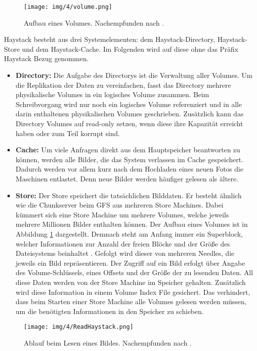 \documentclass[12pt,oneside,a4paper,parskip]{scrbook}
\begin{document}
\begin{figure}
  \centering
  \texttt{[image: img/4/volume.png]}
  \caption[Aufbau eines Volumes]{ Aufbau eines Volumes. Nachempfunden nach \cite{haystack}.}
  \label{volume}
\end{figure}
Haystack besteht aus drei Systemelementen: dem Haystack-Directory, Haystack-Store und dem Haystack-Cache. Im Folgenden wird auf diese ohne das Präfix Haystack Bezug genommen.
\begin{itemize}
  \item \textbf{Directory:} Die Aufgabe des Directorys ist die Verwaltung aller Volumes. Um die Replikation der Daten zu vereinfachen, fasst das Directory mehrere physikalische Volumes in ein logisches Volume zusammen. Beim Schreibvorgang wird nur noch ein logisches Volume referenziert und in alle darin enthaltenen physikalischen Volumes geschrieben. Zusätzlich kann das Directory Volumes auf read-only setzen, wenn diese ihre Kapazität erreicht haben oder zum Teil korrupt sind.
  \item \textbf{Cache:} Um viele Anfragen direkt aus dem Hauptspeicher beantworten zu können, werden alle Bilder, die das System verlassen im Cache gespeichert. Dadurch werden vor allem kurz nach dem Hochladen eines neuen Fotos die Maschinen entlastet. Denn neue Bilder werden häufiger gelesen als ältere.
  \item \textbf{Store:} Der Store speichert die tatsächlichen Bilddaten. Er besteht ähnlich wie die Chunkserver beim GFS aus mehreren Store Machines. Dabei kümmert sich eine Store Machine um mehrere Volumes, welche jeweils mehrere Millionen Bilder enthalten können. Der Aufbau eines Volumes ist in Abbildung \ref{volume} dargestellt. Demnach steht am Anfang immer ein Superblock, welcher Informationen zur Anzahl der freien Blöcke und der Größe des Dateisystems beinhaltet \cite{wiki:superblock}. Gefolgt wird dieser von mehreren Needles, die jeweils ein Bild repräsentieren. Der Zugriff auf ein Bild erfolgt über Angabe des Volume-Schlüssels, eines Offsets und der Größe der zu lesenden Daten. All diese Daten werden von der Store Machine im Speicher gehalten. Zusätzlich wird diese Information in einem Volume Index File gesichert. Das verhindert, dass beim Starten einer Store Machine alle Volumes gelesen werden müssen, um die benötigten Informationen in den Speicher zu schieben. 
\end{itemize}

\begin{figure}[h]
  \centering
  \texttt{[image: img/4/ReadHaystack.png]}
  \caption[Ablauf beim Lesen eines Bildes.]{ Ablauf beim Lesen eines Bildes. Nachempfunden nach \cite{haystack}.}
  \label{readHaystack}
\end{figure}
\end{document}
